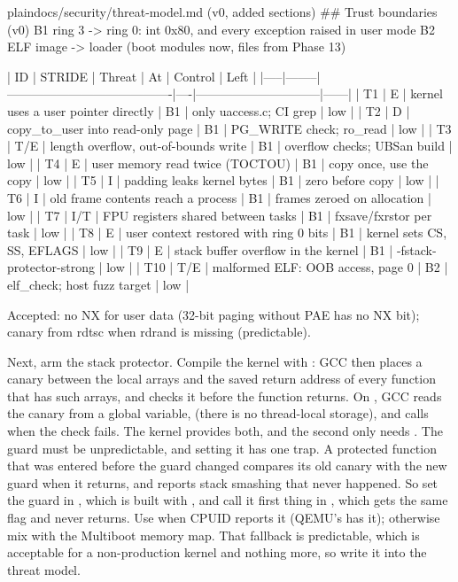 \documentclass[11pt,a4paper]{article}
\begin{document}
\begin{lst}{plain}{docs/security/threat-model.md (v0, added sections)}
## Trust boundaries (v0)
B1  ring 3 -> ring 0: int 0x80, and every exception raised in user mode
B2  ELF image -> loader (boot modules now, files from Phase 13)

| ID  | STRIDE | Threat                                 | At | Control                      | Left |
|-----|--------|----------------------------------------|----|------------------------------|------|
| T1  | E      | kernel uses a user pointer directly    | B1 | only uaccess.c; CI grep      | low  |
| T2  | D      | copy_to_user into read-only page       | B1 | PG_WRITE check; ro_read      | low  |
| T3  | T/E    | length overflow, out-of-bounds write   | B1 | overflow checks; UBSan build | low  |
| T4  | E      | user memory read twice (TOCTOU)        | B1 | copy once, use the copy      | low  |
| T5  | I      | padding leaks kernel bytes             | B1 | zero before copy             | low  |
| T6  | I      | old frame contents reach a process     | B1 | frames zeroed on allocation  | low  |
| T7  | I/T    | FPU registers shared between tasks     | B1 | fxsave/fxrstor per task      | low  |
| T8  | E      | user context restored with ring 0 bits | B1 | kernel sets CS, SS, EFLAGS   | low  |
| T9  | E      | stack buffer overflow in the kernel    | B1 | -fstack-protector-strong     | low  |
| T10 | T/E    | malformed ELF: OOB access, page 0      | B2 | elf_check; host fuzz target  | low  |

Accepted: no NX for user data (32-bit paging without PAE has no NX bit);
canary from rdtsc when rdrand is missing (predictable).
\end{lst}

Next, arm the stack protector. Compile the kernel with : GCC then places a canary
between the local arrays and the saved return address of every function that has such arrays, and checks it before
the function returns. On , GCC reads the canary from a global variable,  (there
is no thread-local storage), and calls  when the check fails. The kernel provides both, and the second
only needs . The guard must be unpredictable, and setting it has one trap. A protected function that was
entered before the guard changed compares its old canary with the new guard when it returns, and reports stack
smashing that never happened. So set the guard in , which is built with ,
and call it first thing in , which gets the same flag and never returns. Use  when CPUID
reports it (QEMU's  has it); otherwise mix  with the Multiboot memory map. That fallback is
predictable, which is acceptable for a non-production kernel and nothing more, so write it into the threat model.
\end{document}
